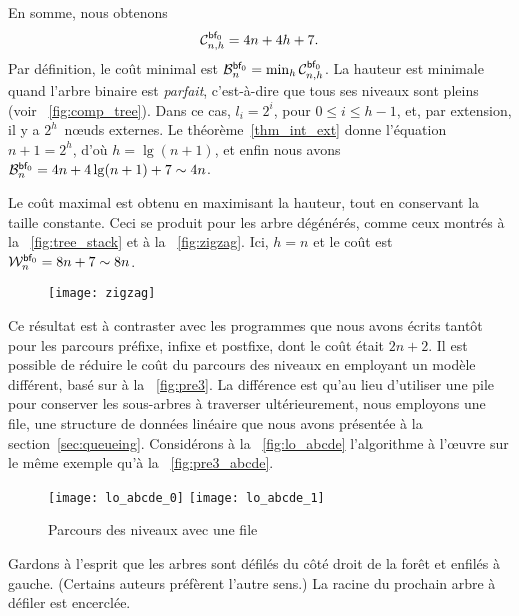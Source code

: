 En somme, nous obtenons
\begin{equation*}
\C{\fun{bf}_0}{n,h} = 4n + 4h + 7. \index{bf0@$\C{\fun{bf}_0}{n,h}$}
\end{equation*}
Par définition, le coût minimal est \(\B{\fun{bf}_0}{n} =
\min_h\C{\fun{bf}_0}{n,h}\). La hauteur
est minimale quand l'arbre binaire est \emph{parfait}, c'est-à-dire que tous ses niveaux sont
pleins (voir \fig~\vref{fig:comp_tree}). Dans ce cas, \(l_i=2^i\),
pour \(0 \leqslant i \leqslant h-1\), et, par extension, il y a
\(2^h\)~nœuds externes. Le théorème~\ref{thm_int_ext} donne
l'équation \(n+1 = 2^h\), d'où \(h=\lg(n+1)\), et enfin nous avons
\(\B{\fun{bf}_0}{n} = 4n + 4\lg(n+1) + 7 \sim
4n\). 

Le coût maximal est obtenu en maximisant la hauteur, tout en conservant la taille constante. Ceci se
produit pour les arbre dégénérés,
comme ceux montrés à la \fig~\vref{fig:tree_stack} et à la
\fig~\vref{fig:zigzag}. Ici, \(h=n\) et le coût est
\(\W{\fun{bf}_0}{n} = 8n + 7 \sim
8n\). 

%
\begin{wrapfigure}[7]{r}[0pt]{0pt}
\centering
\texttt{[image: zigzag]}
\caption{}
\label{fig:zigzag}
\end{wrapfigure}
Ce résultat est à contraster avec les programmes que nous avons écrits
tantôt pour les parcours préfixe, infixe et postfixe, dont le coût
était \(2n+2\). Il est possible de réduire le coût du parcours des
niveaux en employant un modèle différent, basé sur
 à la
\fig~\vref{fig:pre3}. La différence est qu'au lieu d'utiliser une pile
pour conserver les sous-arbres à traverser ultérieurement, nous
employons une file, une structure de données linéaire que
nous avons présentée à la section~\ref{sec:queueing}. Considérons à la
\fig~\vref{fig:lo_abcde} l'algorithme à l'œuvre sur le même
exemple qu'à la \fig~\vref{fig:pre3_abcde}.
\begin{figure}[b]
\centering
\texttt{[image: lo\_abcde\_0]}
\bigskip
\texttt{[image: lo\_abcde\_1]}
\caption{Parcours des niveaux avec une file}
\label{fig:lo_abcde}
\end{figure}
Gardons à l'esprit que les arbres sont défilés du côté droit de la
forêt et enfilés à gauche. (Certains auteurs préfèrent l'autre sens.)
La racine du prochain arbre à défiler est encerclée.

